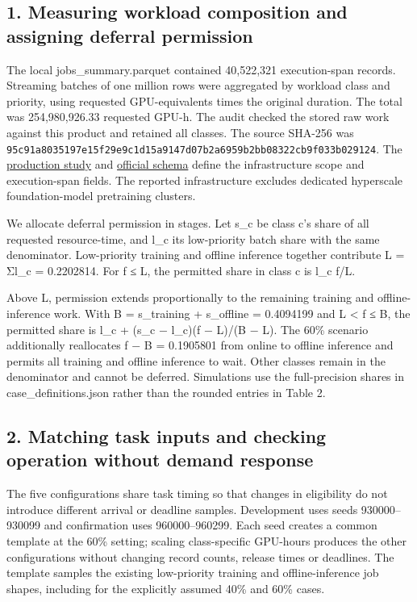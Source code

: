 \documentclass[10pt,a4paper]{article}
\begin{document}
\subsection{1. Measuring workload composition and assigning deferral permission}

The local jobs\_summary.parquet contained 40,522,321 execution-span records. Streaming batches of one million rows were aggregated by workload class and priority, using requested GPU-equivalents times the original duration. The total was 254,980,926.33 requested GPU-h. The audit checked the stored raw work against this product and retained all classes. The source SHA-256 was \texttt{95c9\allowbreak{}1a80\allowbreak{}3519\allowbreak{}7e15\allowbreak{}f29e\allowbreak{}9c1d\allowbreak{}15a9\allowbreak{}147d\allowbreak{}07b2\allowbreak{}a695\allowbreak{}9b2b\allowbreak{}b083\allowbreak{}22cb\allowbreak{}9f03\allowbreak{}3b02\allowbreak{}9124}. The \href{https://www.usenix.org/system/files/osdi26-li-suyi.pdf}{production study} and \href{https://github.com/alibaba/clusterdata/blob/master/cluster-trace-gpu-v2026/docs/schema.md}{official schema} define the infrastructure scope and execution-span fields. The reported infrastructure excludes dedicated hyperscale foundation-model pretraining clusters.


We allocate deferral permission in stages. Let s\_c be class c's share of all requested resource-time, and l\_c its low-priority batch share with the same denominator. Low-priority training and offline inference together contribute L = Σl\_c = 0.2202814. For f ≤ L, the permitted share in class c is l\_c f/L.


Above L, permission extends proportionally to the remaining training and offline-inference work. With B = s\_training + s\_offline = 0.4094199 and L < f ≤ B, the permitted share is l\_c + (s\_c − l\_c)(f − L)/(B − L). The 60\% scenario additionally reallocates f − B = 0.1905801 from online to offline inference and permits all training and offline inference to wait. Other classes remain in the denominator and cannot be deferred. Simulations use the full-precision shares in case\_definitions.json rather than the rounded entries in Table 2.


\subsection{2. Matching task inputs and checking operation without demand response}

The five configurations share task timing so that changes in eligibility do not introduce different arrival or deadline samples. Development uses seeds 930000–930099 and confirmation uses 960000–960299. Each seed creates a common template at the 60\% setting; scaling class-specific GPU-hours produces the other configurations without changing record counts, release times or deadlines. The template samples the existing low-priority training and offline-inference job shapes, including for the explicitly assumed 40\% and 60\% cases.
\end{document}
